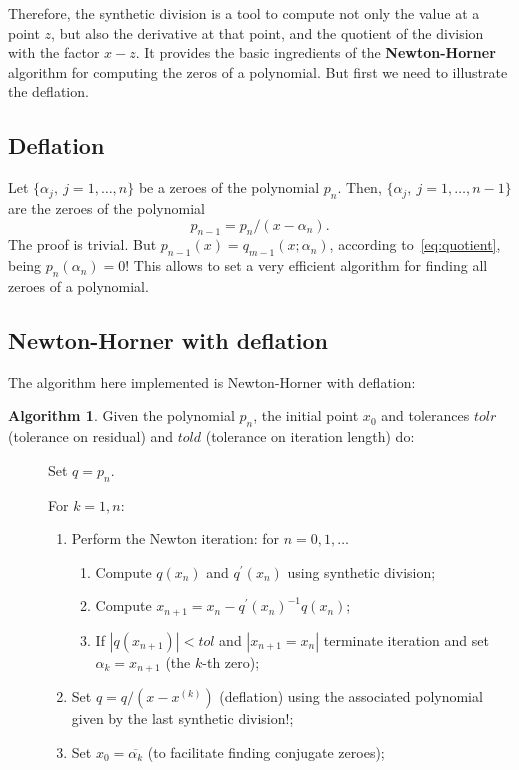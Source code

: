\documentclass[10pt,a4paper]{article}
\theoremstyle{definition}%
\newtheorem{algo}{Algorithm}
\begin{document}
Therefore, the synthetic division is a tool to compute not only the value at a point $z$, but also the derivative at that point, and the quotient of the division with the factor $x-z$. It provides the basic ingredients of the \textbf{Newton-Horner} algorithm for computing the zeros of a polynomial. But first we need to illustrate the deflation.
\subsection{Deflation}
Let $\{\alpha_j,\ j=1,\ldots,n\}$ be a zeroes of the polynomial $p_n$. Then, $\{\alpha_j,\ j=1,\ldots,n-1\}$ are the zeroes of 
the polynomial
\begin{equation}
p_{n-1}=p_n/(x-\alpha_n).
\end{equation} 
The proof is trivial.
But $p_{n-1}(x)=q_{m-1}(x;\alpha_n)$, according to~\eqref{eq:quotient}, being $p_n(\alpha_n)=0$! This allows to set a very efficient algorithm for 
finding all zeroes of a polynomial.
\subsection{Newton-Horner with deflation}
The algorithm here implemented is Newton-Horner with deflation:

\begin{algo}
    Given the polynomial $p_n$, the initial point $x_0$ and tolerances $tolr$ (tolerance on residual) and $told$
    (tolerance on iteration length)
    do:
    \begin{description}
        \item[] Set $q=p_n$.
        \item[] For $k=1,n$:
        \begin{enumerate}
            \item Perform the Newton iteration: for $n=0,1,\ldots$
            \begin{enumerate}
                \item Compute $q(x_n)$ and $q^\prime(x_n)$ using synthetic division;
                \item Compute $x_{n+1}=x_{n}-q^\prime(x_{n})^{-1}q(x_n)$;
                \item If $|q(x_{n+1})|<tol$ and $|x_{n+1}=x_{n}|$ terminate iteration and set
            $\alpha_k=x_{n+1}$ (the $k$-th zero);
            \end{enumerate}
            \item Set $q=q/(x-x^{(k)})$ (deflation) using the associated polynomial given by the last synthetic division!;
            \item Set $x_0=\overline{\alpha_k}$ (to facilitate finding conjugate zeroes);
        \end{enumerate}
    \end{description}
\end{algo}
\end{document}
